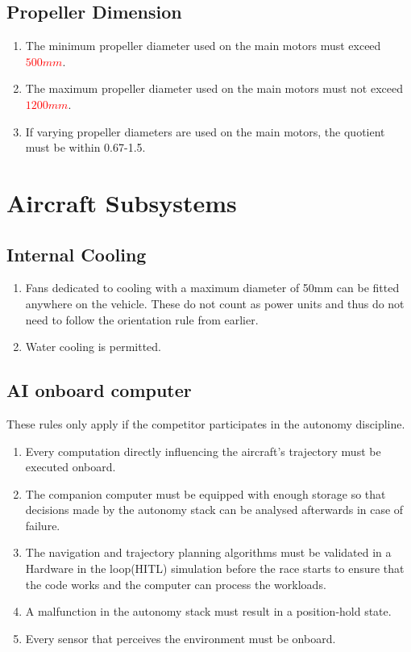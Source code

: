 \documentclass{article}
\begin{document}
\subsection{Propeller Dimension}
\begin{enumerate}
  \item The minimum propeller diameter used on the main motors must exceed \textcolor{red}{$500mm$}.
  \item The maximum propeller diameter used on the main motors must not exceed \textcolor{red}{$1200mm$}.
  \item If varying propeller diameters are used on the main motors, the quotient must be within 0.67-1.5.
\end{enumerate}





\section{Aircraft Subsystems}

\subsection{Internal Cooling}
\begin{enumerate}
  \item Fans dedicated to cooling with a maximum diameter of 50mm can be fitted anywhere on the vehicle. These do not count as power units and thus do not need to follow the orientation rule from earlier.
  \item Water cooling is permitted. 
\end{enumerate}

\subsection{AI onboard computer}
These rules only apply if the competitor participates in the autonomy discipline.
\begin{enumerate}
  \item Every computation directly influencing the aircraft's trajectory must be executed onboard.
  \item The companion computer must be equipped with enough storage so that decisions made by the autonomy stack can be analysed afterwards in case of failure. 
  \item The navigation and trajectory planning algorithms must be validated in a Hardware in the loop(HITL) simulation before the race starts to ensure that the code works and the computer can process the workloads.
  \item A malfunction in the autonomy stack must result in a position-hold state. 
  \item Every sensor that perceives the environment must be onboard.
\end{enumerate}
\end{document}
